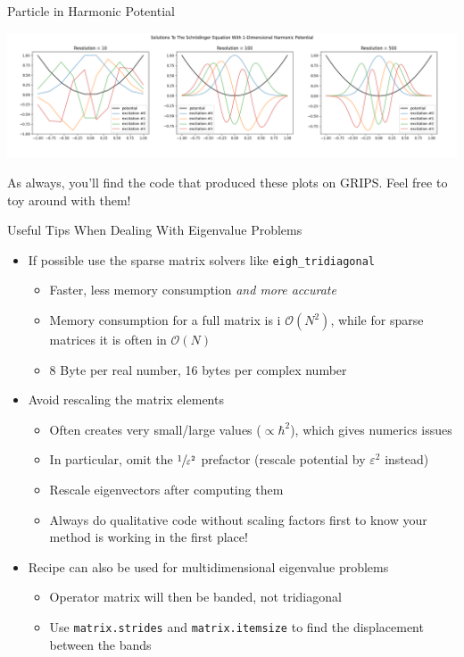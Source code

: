 \begin{frame}{Particle in Harmonic Potential}
%
\begin{center}
\includegraphics[width=\linewidth]{./gfx/04-harmonic-osciallator}
\end{center}
%
\begin{hintbox}
\footnotesize
As always, you'll find the code that produced these plots on GRIPS. Feel free to toy around with them!
\end{hintbox}
%
\end{frame}


\begin{frame}{Useful Tips When Dealing With Eigenvalue Problems}
%
\small
\begin{itemize}
\item If possible use the sparse matrix solvers like \texttt{eigh\_tridiagonal}
	\begin{itemize}
	\item Faster, less memory consumption \emph{and more accurate}
	\item Memory consumption for a full matrix is i $\mathcal{O}(N^2)$, while for sparse matrices it is often in $\mathcal{O}(N)$
	\item 8 Byte per real number, 16 bytes per complex number
	\end{itemize}
\item Avoid rescaling the matrix elements
	\begin{itemize}
	\item Often creates very small/large values ($\propto \hbar^2$), which gives numerics issues
	\item In particular, omit the $\sfrac{1}{\varepsilon^2}$ prefactor (rescale potential by $\varepsilon^2$ instead)
	\item Rescale eigenvectors after computing them
	\item Always do qualitative code without scaling factors first to know your method is working in the first place!
	\end{itemize}
\item Recipe can also be used for multidimensional eigenvalue problems
	\begin{itemize}
	\item Operator matrix will then be banded, not tridiagonal
	\item Use \texttt{matrix.strides} and \texttt{matrix.itemsize} to find the displacement between the bands
	\end{itemize}
\end{itemize}
%
\end{frame}

